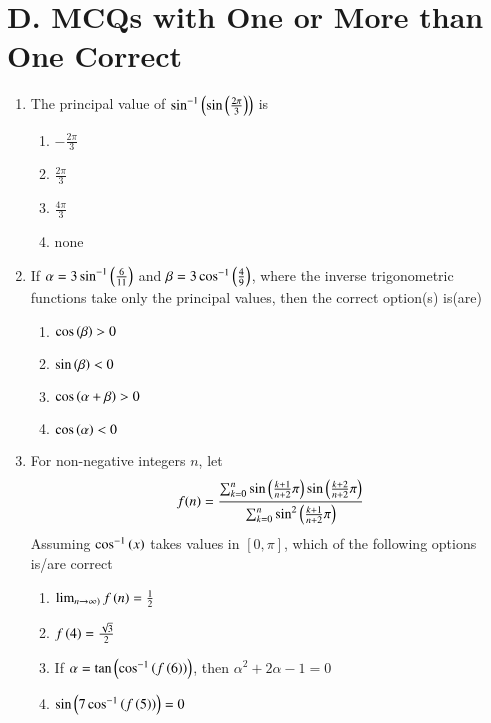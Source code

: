\documentclass[journal,12pt,twocolumn,article]{IEEEtran}
\theoremstyle{remark}
\begin{document}
\section*{D. MCQs with One or More than One Correct}
\begin{enumerate}
\item The principal value of $\sin ^{-1}\left(\sin \left(\frac{2\pi}{3}\right)\right)$ is
\hfill {}
\begin{multicols}{2}
\begin{enumerate}
\item $-\frac{2\pi}{3}$ 
\item $\frac{2\pi}{3}$ 
\columnbreak
\item $\frac{4\pi}{3}$ 
\item none
\end{enumerate}
\end{multicols}
\item If $\alpha=3\sin ^{-1}\left(\frac{6}{11}\right)$ and $\beta=3\cos ^{-1}\left(\frac{4}{9}\right)$, where the inverse trigonometric functions take only the principal values, then the correct option(s) is(are)
\hfill {}
\begin{multicols}{2}
\begin{enumerate} 
\item $\cos \left(\beta\right)>0$ 
\item $\sin \left(\beta\right)<0$
\columnbreak
\item $\cos \left(\alpha + \beta\right) > 0$ 
\item $\cos \left(\alpha\right)<0$
\end{enumerate}
\end{multicols}
\item For non-negative integers $n$, let 
\begin{align*}
f(n)= \frac{\sum_{k=0}^{n} \sin \left(\frac{k+1}{n+2}\pi\right)\sin \left(\frac{k+2}{n+2}\pi\right)}{\sum_{k=0}^{n} \sin ^2 \left(\frac{k+1}{n+2}\pi\right)}
\end{align*}
Assuming $\cos ^{-1}\left(x\right)$ takes values in $[0,\pi]$, which of the following options is/are correct
\hfill {}
\begin{multicols}{2}
\begin{enumerate}
\item $\lim_{n \rightarrow \infty)} f\left(n\right) = \frac{1}{2}$ 
\item $f\left(4\right)=\frac{\sqrt{3}}{2}$
\columnbreak
\item If $\alpha = \tan \left(\cos ^{-1}\left(f\left(6\right)\right)\right)$, then $\alpha ^2 + 2\alpha -1 =0$
\item $\sin \left(7\cos ^{-1}\left(f\left(5\right)\right)\right)=0$
\end{enumerate}
\end{multicols}
\end{enumerate}
\end{document}
